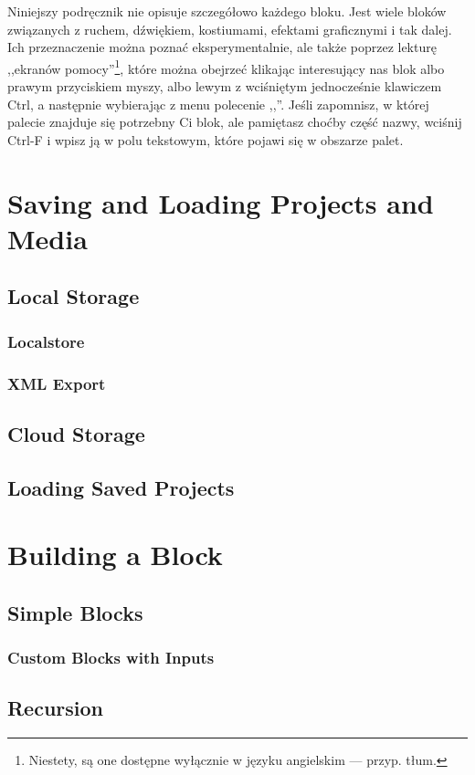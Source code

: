 \documentclass[a4paper]{report}
\begin{document}
Niniejszy podręcznik nie opisuje szczegółowo każdego bloku. Jest wiele bloków związanych z ruchem, dźwiękiem, kostiumami, efektami graficznymi i tak dalej. Ich przeznaczenie można poznać eksperymentalnie, ale także poprzez lekturę ,,ekranów pomocy''\footnote{Niestety, są one dostępne wyłącznie w języku angielskim --- przyp. tłum.}, które można obejrzeć klikając interesujący nas blok albo prawym przyciskiem myszy, albo lewym z wciśniętym jednocześnie klawiczem Ctrl, a następnie wybierając z menu polecenie ,,''. Jeśli zapomnisz, w której palecie znajduje się potrzebny Ci blok, ale pamiętasz choćby część nazwy, wciśnij Ctrl-F i wpisz ją w polu tekstowym, które pojawi się w obszarze palet.

\chapter{Saving and Loading Projects and Media}
\section{Local Storage}
\subsection{Localstore}
\subsection{XML Export}
\section{Cloud Storage}
\section{Loading Saved Projects}
\chapter{Building a Block}
\section{Simple Blocks}
\subsection{Custom Blocks with Inputs}
\section{Recursion}
\end{document}

